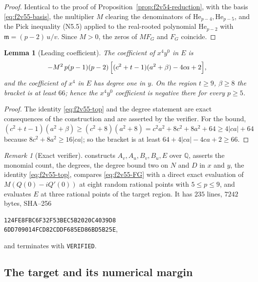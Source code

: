 \documentclass[11pt]{article}
\newtheorem{lemma}[theorem]{Lemma}
\theoremstyle{definition}
\theoremstyle{remark}
\newtheorem{remark}[theorem]{Remark}
\begin{document}
\begin{proof}
Identical to the proof of Proposition~\ref{prop:f2v54-reduction}, with
the basis \eqref{eq:f2v55-basis}, the multiplier \(M\) clearing the
denominators of \(\mathrm{He}_{p-4},\mathrm{He}_{p-5}\), and the Pick
inequality \textup{(N5.5)} applied to the real-rooted polynomial
\(\mathrm{He}_{p-2}\) with \(\mathfrak m=(p-2)\,u/v\).  Since \(M>0\),
the zeros of \(MF_G\) and \(F_G\) coincide.
\end{proof}

\begin{lemma}[Leading coefficient]
\label{lem:f2v55-leading}
The coefficient of \(x^4y^0\) in \(E\) is
\begin{equation}
 -M^2\,p(p-1)(p-2)\,\Bigl[(c^2+t-1)(a^2+\beta)-4ca+2\Bigr],
 \label{eq:f2v55-top}
\end{equation}
and the coefficient of \(x^4\) in \(E\) has degree one in \(y\).  On the
region \(t\ge9\), \(\beta\ge8\) the bracket is at least \(66\); hence
the \(x^4y^0\) coefficient is negative there for every \(p\ge5\).
\end{lemma}

\begin{proof}
The identity \eqref{eq:f2v55-top} and the degree statement are exact
consequences of the construction and are asserted by the verifier.  For
the bound, \((c^2+t-1)(a^2+\beta)\ge(c^2+8)(a^2+8)
 =c^2a^2+8c^2+8a^2+64\ge4|ca|+64\) because \(8c^2+8a^2\ge16|ca|\); so the
bracket is at least \(64+4|ca|-4ca+2\ge66\).
\end{proof}

\begin{remark}[Exact verifier]
\label{rem:f2v55-verifier}
 constructs
\(A_v,A_u,B_v,B_u,E\) over \(\mathbb Q\), asserts the monomial count,
the degrees, the degree bound two on \(N\) and \(D\) in \(x\) and \(y\),
the identity \eqref{eq:f2v55-top}, compares \eqref{eq:f2v55-FG} with a
direct exact evaluation of \(M(Q(0)-iQ'(0))\) at eight random rational
points with \(5\le p\le9\), and evaluates \(E\) at three rational points
of the target region.  It has \(235\) lines, \(7242\) bytes, SHA--256
\begin{center}
\texttt{124FE8FBC6F32F53BEC5B2020C4039D8}\\
\texttt{6DD709014FCD82CDDF685ED86BD5B25E},
\end{center}
and terminates with \texttt{VERIFIED}.
\end{remark}

\subsection{The target and its numerical margin}
\end{document}
